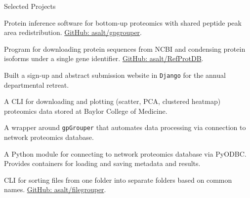 \documentclass[]{mcdowellcv}
\begin{document}
	\begin{cvsection}{Selected Projects}
    \begin{cvsubsection}{}{}{}

			\begin{description}[leftmargin=8em,style=multiline,align=parleft,labelwidth=!]

      \item [\textbf{gpGrouper}] Protein inference software for bottom-up
        proteomics with shared peptide peak area redistribution.
        \href{https://github.com/asalt/gpgrouper}{GitHub: asalt/gpgrouper}.
      \item [\textbf{RefProtDB}] Program for downloading protein sequences from
        NCBI and condensing protein isoforms under a single gene identifier.
        \href{https://github.com/asalt/RefProtDB}{GitHub: asalt/RefProtDB}.
      \item [\textbf{BMB Retreat Website }] Built a sign-up and abstract
        submission website in \texttt{Django} for the annual departmental
        retreat.
      \vspace*{1em} %
      \item [\textbf{tackle}] A CLI for downloading and plotting (scatter, PCA,
        clustered heatmap) proteomics data stored at Baylor College of Medicine.
      \item [\textbf{autogrouper}] A wrapper around \texttt{gpGrouper} that
        automates data processing via connection to network proteomics database.
      \item [\textbf{bcmproteomics}] A Python module for connecting to network
        proteomics database via PyODBC. Provides containers for loading and
        saving metadata and results.
      \item [\textbf{filegrouper}] CLI for sorting files from one folder into
        separate folders based on common names.
        \href{https://github.com/asalt/filegrouper}{GitHub: asalt/filegrouper}.

			\end{description}

    \end{cvsubsection}
	\end{cvsection}
\end{document}

